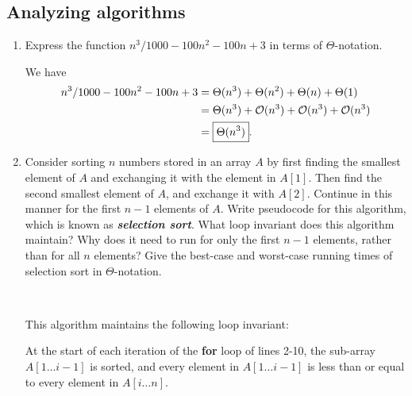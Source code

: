 \documentclass[Chapter02]{subfiles}
\begin{document}
	\subsection{Analyzing algorithms}

	\begin{enumerate}[leftmargin=\labelsep]
		\item Express the function $n^3/1000 - 100n^2 - 100n + 3$ in terms of $\Theta$-notation.
		\begin{answer}
			We have
			\begin{align*}
				n^3/1000 - 100n^2 - 100n + 3 &= \Theta(n^3) + \Theta(n^2) + \Theta(n) + \Theta(1)\\
					&= \Theta(n^3) + \mathcal{O}(n^3) + \mathcal{O}(n^3) + \mathcal{O}(n^3)\\
					&= \boxed{\Theta(n^3)}.
			\end{align*}
		\end{answer}

		\item Consider sorting $n$ numbers stored in an array $A$ by first finding the smallest element of $A$ and exchanging it with the element in $A[1]$. Then find the second smallest element of $A$, and exchange it with $A[2]$. Continue in this manner for the first $n - 1$ elements of $A$. Write pseudocode for this algorithm, which is known as \textbf{\textit{selection sort}}. What loop invariant does this algorithm maintain? Why does it need to run for only the first $n - 1$ elements, rather than for all $n$ elements? Give the best-case and worst-case running times of selection sort in $\Theta$-notation.
		\begin{answer}
			\hfill\\
			\begin{algorithm}[H]

			\end{algorithm}

			This algorithm maintains the following loop invariant:
			\begin{addmargin}[2em]{2em}
				At the start of each iteration of the \textbf{for} loop of lines 2-10, the sub-array $A[1 \dots i - 1]$ is sorted, and every element in $A[1 \dots i - 1]$ is less than or equal to every element in $A[i \dots n]$.
			\end{addmargin}


\end{answer}
\end{enumerate}
\end{document}
